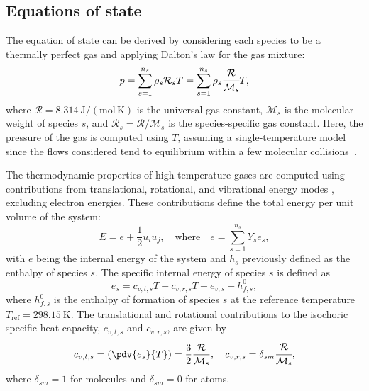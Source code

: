 \subsection{Equations of state}\label{section:equation_of_state}
The equation of state can be derived by considering each species to be a thermally perfect gas and applying Dalton's law for the gas mixture:
\begin{equation}
    p = \sum_{s=1}^{n_s} \rho_{s} \mathcal{R}_s T 
      = \sum_{s=1}^{n_s} \rho_s \cfrac{\mathcal{R}}{\mathcal{M}_s} T,
\end{equation}
where $\mathcal{R} = 8.314~\mathrm{J/(mol\, K)}$ is the universal gas constant, $\mathcal{M}_s$ is the molecular weight of species $s$, and $\mathcal{R}_s = \mathcal{R}/\mathcal{M}_s$ is the species-specific gas constant. Here, the pressure of the gas is computed using $T$, assuming a single-temperature model since the flows considered tend to equilibrium within a few molecular collisions~\citep{Wagnild2012}.


The thermodynamic properties of high-temperature gases are computed using contributions from translational, rotational, and vibrational energy modes \citep{Gnoffo1989}, excluding electron energies. These contributions define the total energy per unit volume of the system:
\begin{equation}
    E = e + \frac{1}{2} u_i u_j,
    \quad \mathrm{where} \quad 
    e = \sum_{s=1}^{n_s} Y_s e_s,
\end{equation}
with $e$ being the internal energy of the system and $h_s$ previously defined as the enthalpy of species $s$. The specific internal energy of species $s$ is defined as
\begin{equation}
    e_s = c_{v,t,s} T + c_{v,r,s} T + e_{v,s} + h^{0}_{f,s},
\end{equation}
where $h^{0}_{f,s}$ is the enthalpy of formation of species $s$ at the reference temperature $T_{\mathrm{ref}} = 298.15~\mathrm{K}$. The translational and rotational contributions to the isochoric specific heat capacity, $c_{v,t,s}$ and $c_{v,r,s}$, are given by
\begin{equation}
    c_{v,t,s} = \left(\pdv{e_{s}}{T}\right) = \frac{3}{2} \frac{\mathcal{R}}{\mathcal{M}_s},
    \quad
    c_{v,r,s} = \delta_{sm} \cfrac{\mathcal{R}}{\mathcal{M}_s},
\end{equation}
where $\delta_{sm} = 1$ for molecules and $\delta_{sm} = 0$ for atoms.

